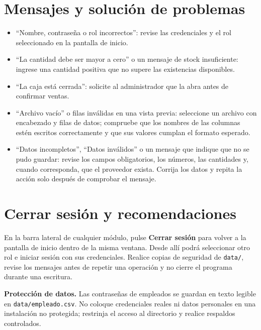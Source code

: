 \documentclass[12pt,a4paper]{article}
\begin{document}
\section{Mensajes y solución de problemas}
\begin{itemize}
\item ``Nombre, contraseña o rol incorrectos'': revise las credenciales y el rol seleccionado en la pantalla de inicio.
\item ``La cantidad debe ser mayor a cero'' o un mensaje de stock insuficiente: ingrese una cantidad positiva que no supere las existencias disponibles.
\item ``La caja está cerrada'': solicite al administrador que la abra antes de confirmar ventas.
\item ``Archivo vacío'' o filas inválidas en una vista previa: seleccione un archivo con encabezado y filas de datos; compruebe que los nombres de las columnas estén escritos correctamente y que sus valores cumplan el formato esperado.
\item ``Datos incompletos'', ``Datos inválidos'' o un mensaje que indique que no se pudo guardar: revise los campos obligatorios, los números, las cantidades y, cuando corresponda, que el proveedor exista. Corrija los datos y repita la acción solo después de comprobar el mensaje.
\end{itemize}

\section{Cerrar sesión y recomendaciones}
En la barra lateral de cualquier módulo, pulse \textbf{Cerrar sesión} para volver a la pantalla de inicio dentro de la misma ventana. Desde allí podrá seleccionar otro rol e iniciar sesión con sus credenciales. Realice copias de seguridad de \texttt{data/}, revise los mensajes antes de repetir una operación y no cierre el programa durante una escritura.
\begin{warningbox}\textbf{Protección de datos.} Las contraseñas de empleados se guardan en texto legible en \texttt{data/empleado.csv}. No coloque credenciales reales ni datos personales en una instalación no protegida; restrinja el acceso al directorio y realice respaldos controlados.\end{warningbox}
\end{document}
